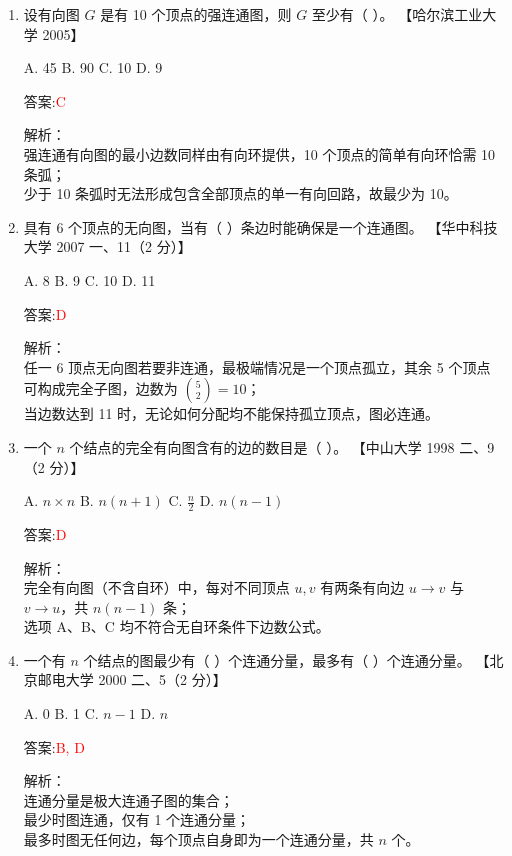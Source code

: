 \documentclass[lang=cn,newtx,10pt,scheme=chinese]{../../../elegantbook}
\begin{document}
\begin{enumerate}
\item 设有向图 $G$ 是有 10 个顶点的强连通图，则 $G$ 至少有（ ）。  
    【哈尔滨工业大学 2005】

    A. 45  
    B. 90  
    C. 10  
    D. 9

    答案:\textcolor{red}{C}

    解析：\\
    强连通有向图的最小边数同样由有向环提供，10 个顶点的简单有向环恰需 10 条弧；\\
    少于 10 条弧时无法形成包含全部顶点的单一有向回路，故最少为 10。\\

\item 具有 6 个顶点的无向图，当有（ ）条边时能确保是一个连通图。  
    【华中科技大学 2007 一、11（2 分）】

    A. 8  
    B. 9  
    C. 10  
    D. 11

    答案:\textcolor{red}{D}

    解析：\\
    任一 6 顶点无向图若要非连通，最极端情况是一个顶点孤立，其余 5 个顶点可构成完全子图，边数为 $\binom{5}{2}=10$；\\
    当边数达到 11 时，无论如何分配均不能保持孤立顶点，图必连通。\\

\item 一个 $n$ 个结点的完全有向图含有的边的数目是（ ）。  
    【中山大学 1998 二、9（2 分）】

    A. $n\times n$  
    B. $n(n+1)$  
    C. $\frac{n}{2}$  
    D. $n(n-1)$

    答案:\textcolor{red}{D}

    解析：\\
    完全有向图（不含自环）中，每对不同顶点 $u,v$ 有两条有向边 $u\to v$ 与 $v\to u$，共 $n(n-1)$ 条；\\
    选项 A、B、C 均不符合无自环条件下边数公式。\\

\item 一个有 $n$ 个结点的图最少有（ ）个连通分量，最多有（ ）个连通分量。  
    【北京邮电大学 2000 二、5（2 分）】

    A. 0  
    B. 1  
    C. $n-1$  
    D. $n$

    答案:\textcolor{red}{B, D}

    解析：\\
    连通分量是极大连通子图的集合；\\
    最少时图连通，仅有 1 个连通分量；\\
    最多时图无任何边，每个顶点自身即为一个连通分量，共 $n$ 个。\\


\end{enumerate}
\end{document}
